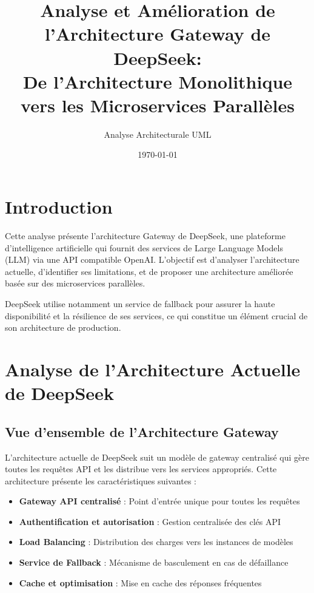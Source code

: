 \documentclass[12pt,a4paper]{article}
\title{Analyse et Amélioration de l'Architecture Gateway de DeepSeek:\\
De l'Architecture Monolithique vers les Microservices Parallèles}
\author{Analyse Architecturale UML}
\date{\today}
\begin{document}
\maketitle

\tableofcontents
\newpage

\section{Introduction}

Cette analyse présente l'architecture Gateway de DeepSeek, une plateforme d'intelligence artificielle qui fournit des services de Large Language Models (LLM) via une API compatible OpenAI. L'objectif est d'analyser l'architecture actuelle, d'identifier ses limitations, et de proposer une architecture améliorée basée sur des microservices parallèles.

DeepSeek utilise notamment un service de fallback pour assurer la haute disponibilité et la résilience de ses services, ce qui constitue un élément crucial de son architecture de production.

\section{Analyse de l'Architecture Actuelle de DeepSeek}

\subsection{Vue d'ensemble de l'Architecture Gateway}

L'architecture actuelle de DeepSeek suit un modèle de gateway centralisé qui gère toutes les requêtes API et les distribue vers les services appropriés. Cette architecture présente les caractéristiques suivantes :

\begin{itemize}
    \item \textbf{Gateway API centralisé} : Point d'entrée unique pour toutes les requêtes
    \item \textbf{Authentification et autorisation} : Gestion centralisée des clés API
    \item \textbf{Load Balancing} : Distribution des charges vers les instances de modèles
    \item \textbf{Service de Fallback} : Mécanisme de basculement en cas de défaillance
    \item \textbf{Cache et optimisation} : Mise en cache des réponses fréquentes
\end{itemize}
\end{document}
